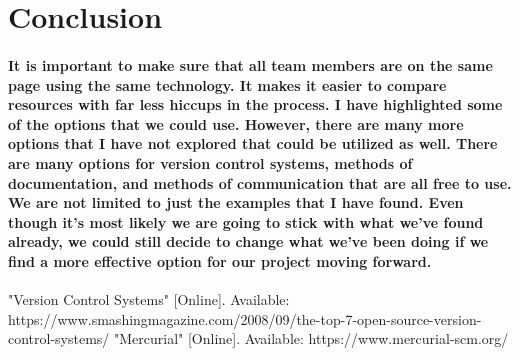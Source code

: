 \documentclass[letterpaper, 10pt, draftclsnofoot, onecolumn, IEEETran]{article}
\begin{document}
\section*{Conclusion}
\paragraph{It is important to make sure that all team members are on the same page using the same technology. It makes it easier to compare resources with far less hiccups in the process. I have highlighted some of the options that we could use. However, there are many more options that I have not explored that could be utilized as well. There are many options for version control systems, methods of documentation, and methods of communication that are all free to use. We are not limited to just the examples that I have found. Even though it's most likely we are going to stick with what we've found already, we could still decide to change what we've been doing if we find a more effective option for our project moving forward.}

\newpage
\begin{thebibliography}{}
"Version Control Systems" [Online]. Available: https://www.smashingmagazine.com/2008/09/the-top-7-open-source-version-control-systems/
"Mercurial" [Online]. Available: https://www.mercurial-scm.org/

\end{thebibliography}
\end{document}
